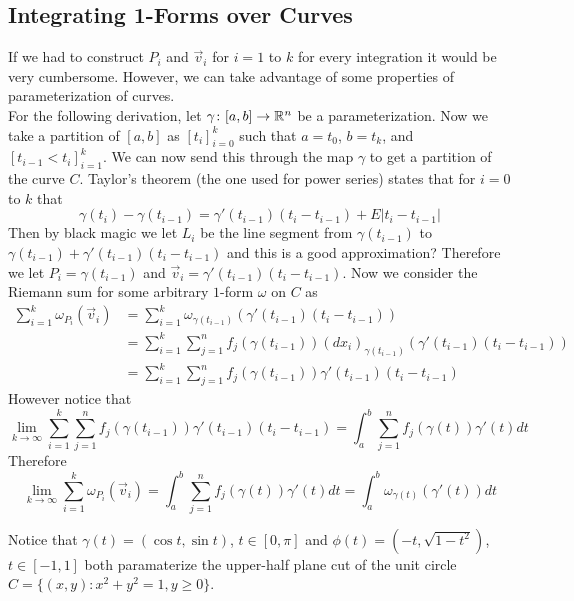 \documentclass[notes]{subfiles}
\begin{document}
\subsection{Integrating 1-Forms over Curves}
If we had to construct $P_i$ and $\vec{v}_i$ for $i = 1$ to $k$ for every integration it would be very cumbersome. However, we can take advantage of some properties of parameterization of curves. \\
For the following derivation, let $\gamma\colon[a, b] \to \mathbb{R}^n$ be a parameterization. Now we take a partition of $[a, b]$ as $[t_i]_{i = 0}^k$ such that $a = t_0$, $b = t_k$, and $[t_{i - 1} < t_i]_{i = 1}^k$. We can now send this through the map $\gamma$ to get a partition of the curve $C$. Taylor's theorem (the one used for power series) states that for $i = 0$ to $k$ that
\[
    \gamma(t_i) - \gamma(t_{i - 1}) = \gamma'(t_{i - 1})(t_i - t_{i -1}) + E|t_i - t_{i - 1}|
\]
Then by black magic we let $L_i$ be the line segment from $\gamma(t_{i - 1})$ to $\gamma(t_{i - 1}) + \gamma'(t_{i - 1})(t_i - t_{i - 1})$ and this is a good approximation? Therefore we let $P_i = \gamma(t_{i - 1})$ and $\vec{v}_i = \gamma'(t_{i - 1})(t_i - t_{i - 1})$. Now we consider the Riemann sum for some arbitrary $1$-form $\omega$ on $C$ as
\begin{align*}
    \sum_{i = 1}^k \omega_{P_i}(\vec{v}_i)
    &= \sum_{i = 1}^k \omega_{\gamma(t_{i - 1})}(\gamma'(t_{i - 1})(t_i - t_{i - 1})) \\
    &= \sum_{i = 1}^k \sum_{j = 1}^n f_j(\gamma(t_{i - 1}))(dx_i)_{\gamma(t_{i - 1})}(\gamma'(t_{i - 1})(t_i - t_{i - 1})) \\
    &= \sum_{i = 1}^k \sum_{j = 1}^n f_j(\gamma(t_{i - 1}))\gamma'(t_{i - 1})(t_i - t_{i - 1})
\end{align*}
However notice that
\[
    \lim_{k\to\infty} \sum_{i = 1}^k \sum_{j = 1}^n f_j(\gamma(t_{i - 1}))\gamma'(t_{i - 1})(t_i - t_{i - 1}) = \int_a^b \sum_{j = 1}^n f_j(\gamma(t))\gamma'(t)dt
\]
Therefore
\[
    \lim_{k\to\infty} \sum_{i = 1}^k \omega_{P_i}(\vec{v}_i) = \int_a^b \sum_{j = 1}^n f_j(\gamma(t))\gamma'(t)dt = \int_a^b \omega_{\gamma(t)}(\gamma'(t))dt
\]

Notice that $\gamma(t) = (\cos t, \sin t)$, $t \in [0, \pi]$ and $\phi(t) = (-t, \sqrt{1 - t^2})$, $t \in [-1, 1]$ both paramaterize the upper-half plane cut of the unit circle $C = \{ (x, y) : x^2 + y^2 = 1, y \geq 0 \}$.
\end{document}
